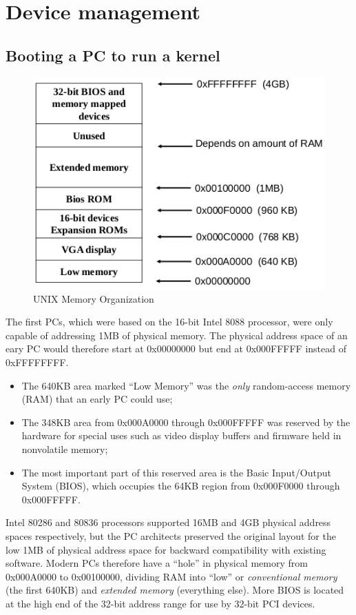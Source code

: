 \chapter{Device management}
\section{Booting a PC to run a kernel}
\begin{figure}[hbtp]
\centering
\includegraphics[scale=0.4]{images/device_management/booting_memory.png}
\caption{UNIX Memory Organization}
\end{figure}

The first PCs, which were based on the 16-bit Intel 8088 processor, were only capable of addressing 1MB of physical memory. The physical address space of an eary PC would therefore start at 0x00000000 but end at 0x000FFFFF instead of 0xFFFFFFFF.
\begin{itemize}
\item The 640KB area marked ``Low Memory'' was the \textit{only} random-access memory (RAM) that an early PC could use;
\item The 348KB area from 0x000A0000 through 0x000FFFFF was reserved by the hardware for special uses such as video display buffers and firmware held in nonvolatile memory;
\item The most important part of this reserved area is the Basic Input/Output System (BIOS), which occupies the 64KB region from 0x000F0000 through 0x000FFFFF.
\end{itemize}

Intel 80286 and 80836 processors supported 16MB and 4GB physical address spaces respectively, but the PC architects preserved the original layout for the low 1MB of physical address space for backward compatibility with existing software. Modern PCs therefore have a ``hole'' in physical memory from 0x000A0000 to 0x00100000, dividing RAM into ``low'' or \emph{conventional memory} (the first 640KB) and \emph{extended memory} (everything else).
More BIOS is located at the high end of the 32-bit address range for use by 32-bit PCI devices.

